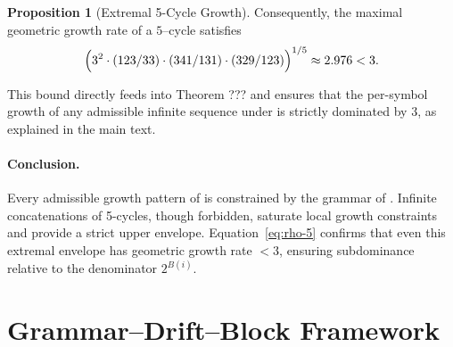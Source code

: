 \documentclass[12pt, oneside]{article}
\numberwithin{equation}{section}
\theoremstyle{definition}
\newtheorem{proposition}{Proposition}[section]
\theoremstyle{plain}
\theoremstyle{remark}
\begin{document}
\begin{proposition}[Extremal 5-Cycle Growth]
Consequently, the maximal geometric growth rate of a $5$--cycle satisfies
\begin{equation}
\Bigl(
3^2 \cdot (123/33) \cdot (341/131) \cdot (329/123)
\Bigr)^{1/5} 
\approx 2.976 < 3.
\label{eq:rho-5}
\end{equation}

This bound directly feeds into Theorem ??? and ensures that
the per-symbol growth of any admissible infinite sequence under 
is strictly dominated by $3$, as explained in the main text.

\paragraph{Conclusion.}
Every admissible growth pattern of  is constrained by the grammar
of . Infinite concatenations of 5-cycles, though forbidden, saturate
local growth constraints and provide a strict upper envelope. Equation~\eqref{eq:rho-5}
confirms that even this extremal envelope has geometric growth rate $< 3$, ensuring
subdominance relative to the denominator $2^{B(i)}$.

\newpage
\section{Grammar–Drift–Block Framework}
\label{sec:grammar-drift-block}


\end{proposition}
\end{document}
